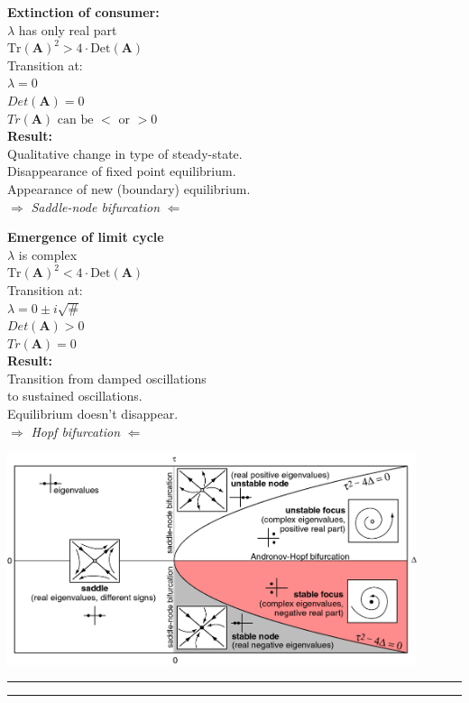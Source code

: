 \documentclass{article}
\newcommand{\ind}{\-\hspace{1cm}}
\begin{document}
\begin{minipage}[t]{\dimexpr.5\textwidth-.5\columnsep}
\textbf{Extinction of consumer:}\\
\ind $\lambda$ has only real part\\
\ind \ind $\text{Tr}(\textbf{A})^2 > 4\cdot\text{Det}(\textbf{A})$\\
\ind Transition at:\\
\ind \ind $\lambda = 0$\\
\ind \ind $ Det(\mathbf{A})=0$\\
\ind \ind $Tr(\mathbf{A}) \text{ can be } < \text{ or } > 0$\\

\textbf{Result:}\\
Qualitative change in type of steady-state.\\
Disappearance of fixed point equilibrium.\\
Appearance of new (boundary) equilibrium.\\

\ind $\Rightarrow$ \emph{Saddle-node bifurcation} $\Leftarrow$
\end{minipage} %
\begin{minipage}[t]{\dimexpr.5\textwidth-.5\columnsep}
\textbf{Emergence of limit cycle}\\
\ind $\lambda$ is complex\\
\ind \ind $\text{Tr}(\textbf{A})^2 < 4\cdot\text{Det}(\mathbf{A})$\\
\ind Transition at:\\
\ind \ind $\lambda = 0 \pm i \sqrt{\#}$\\
\ind \ind $Det(\mathbf{A})>0$\\
\ind \ind $Tr(\mathbf{A})=0$\\

\textbf{Result:}\\
Transition from damped oscillations\\
\ind to sustained oscillations.\\
Equilibrium doesn't disappear.\\

\ind \ind $\Rightarrow$ \emph{Hopf bifurcation}  $\Leftarrow$
\end{minipage}

\begin{center}
  	\includegraphics[width=12cm]{figs/Tr_v_Det.png}
\end{center}


\rule[0.5ex]{\linewidth}{1pt}
\rule[0.5ex]{\linewidth}{1pt}
\end{document}
